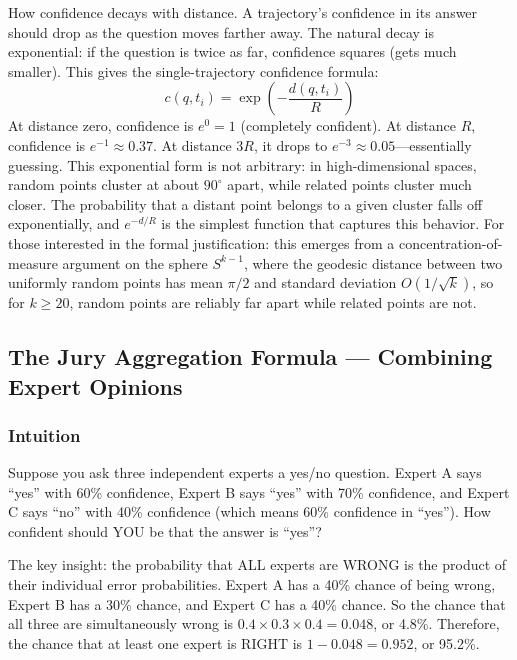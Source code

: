 \documentclass[11pt]{article}
\begin{document}
How confidence decays with distance. A trajectory's confidence in its
answer should drop as the question moves farther away. The natural decay is
exponential: if the question is twice as far, confidence squares (gets much
smaller). This gives the single-trajectory confidence formula:
\begin{equation}\label{eq:single_trial}
c(q, t_i) = \exp\left(-\frac{d(q, t_i)}{R}\right)
\end{equation}
At distance zero, confidence is $e^0 = 1$ (completely confident). At distance
$R$, confidence is $e^{-1} \approx 0.37$. At distance $3R$, it drops to
$e^{-3} \approx 0.05$---essentially guessing. This exponential form is not
arbitrary: in high-dimensional spaces, random points cluster at about $90^\circ$
apart, while related points cluster much closer. The probability that a distant
point belongs to a given cluster falls off exponentially, and $e^{-d/R}$ is the
simplest function that captures this behavior. For those interested in the
formal justification: this emerges from a concentration-of-measure argument on
the sphere $S^{k-1}$, where the geodesic distance between two uniformly random
points has mean $\pi/2$ and standard deviation $O(1/\sqrt{k})$, so for $k \ge
20$, random points are reliably far apart while related points are not.

\subsection{The Jury Aggregation Formula --- Combining Expert Opinions}

\subsubsection*{Intuition}

Suppose you ask three independent experts a yes/no question. Expert A says
``yes'' with 60\% confidence, Expert B says ``yes'' with 70\% confidence, and
Expert C says ``no'' with 40\% confidence (which means 60\% confidence in
``yes''). How confident should YOU be that the answer is ``yes''?

The key insight: the probability that ALL experts are WRONG is the product of
their individual error probabilities. Expert A has a 40\% chance of being
wrong, Expert B has a 30\% chance, and Expert C has a 40\% chance. So the
chance that all three are simultaneously wrong is $0.4 \times 0.3 \times 0.4
= 0.048$, or 4.8\%. Therefore, the chance that at least one expert is RIGHT
is $1 - 0.048 = 0.952$, or 95.2\%.
\end{document}
